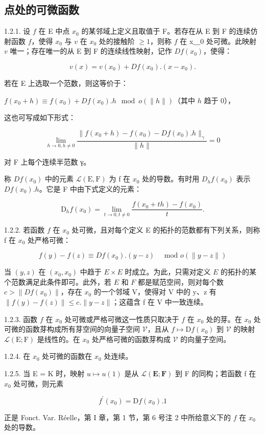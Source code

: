 \subsection{点处的可微函数}

1.2.1. 设 \(f\) 在 E 中点 \(x_{0}\) 的某邻域上定义且取值于 F。若存在从 E 到 F 的连续仿射函数 \(f\)，使得 \(x_{0}\) 与 \(v\) 在 \(x_{0}\) 处的接触阶 \(\geqslant 1\)，则称 \(f\) 在 x＿0 处可微。此映射 \(v\) 唯一；存在唯一的从 E 到 F 的连续线性映射，记作 \(Df(x_{0})\)，使得：

\[
v (x) = v \left(x _ {0}\right) + D f \left(x _ {0}\right). \left(x - x _ {0}\right).
\]

若在 E 上选取一个范数，则这等价于：

\(f(x_0 + h) \equiv f(x_0) + Df(x_0).h \mod o(\|h\|)\)（其中 \(h\) 趋于 0），

这也可写成如下形式：

\[
\lim _ {h \rightarrow 0, h \neq 0} \frac {\| f (x _ {0} + h) - f (x _ {0}) - D f (x _ {0}) . h \| _ {\gamma}}{\| h \|} = 0
\]

对 F 上每个连续半范数 γ。

称 \(Df(x_{0})\) 中的元素 \(\mathcal{L}(\mathrm{E},\mathrm{F})\) 为 f 在 \(x_{0}\) 处的导数。有时用 \(D_{h}f(x_{0})\) 表示 \(Df(x_{0}).h\)。它是 F 中由下式定义的元素：

\[
\mathrm{D} _ {h} f (x _ {0}) = \lim _ {t \rightarrow 0, t \neq 0} \frac {f (x _ {0} + t h) - f (x _ {0})}{t}.
\]

1.2.2. 若函数 \(f\) 在 \(x_{0}\) 处可微，且对每个定义 E 的拓扑的范数都有下列关系，则称 f 在 \(x_{0}\) 处严格可微：

\[
f (y) - f (z) \equiv D f (x _ {0}). (y - z) \quad \text {   mod   } o (\| y - z \|)
\]

当 \((y, z)\) 在 \((x_0, x_0)\) 中趋于 \(E \times E\) 时成立。为此，只需对定义 \(E\) 的拓扑的某个范数满足此条件即可。此外，若 \(E\) 和 \(F\) 都是赋范空间，则对每个数 \(c > \|Df(x_0)\|\)，存在 \(x_{0}\) 的一个邻域 V，使得对 V 中的 y、z 有 \(\|f(y)-f(z)\|\leqslant c.\|y-z\|\)；这蕴含 f 在 V 中一致连续。

1.2.3. 函数 \(f\) 在 \(x_{0}\) 处可微或严格可微这一性质只取决于 \(f\) 在 \(x_{0}\) 处的芽。在 \(x_{0}\) 处可微的函数芽构成所有芽空间的向量子空间 \(\mathcal{V}\)，且从 \(f\mapsto\mathrm{D}f(x_{0})\) 到 \(\mathcal{V}\) 的映射 \(\mathcal{L}(\mathrm{E};\mathrm{F})\) 是线性的。在 \(x_{0}\) 处严格可微的函数芽构成 \(\mathcal{V}\) 的向量子空间。

1.2.4. 在 \(x_0\) 处可微的函数在 \(x_0\) 处连续。

1.2.5. 当 E = K 时，映射 \(u \mapsto u(1)\) 是从 \(\mathcal{L}(\mathbf{E}; \mathbf{F})\) 到 F 的同构；若函数 f 在 \(x_{0}\) 处可微，则元素

\[
f ^ {\prime} (x _ {0}) = \mathrm{D} f (x _ {0}). 1
\]

正是 Fonct. Var. Réelle，第 I 章，第 1 节，第 6 号注 2 中所给意义下的 \(f\) 在 \(x_0\) 处的导数。

